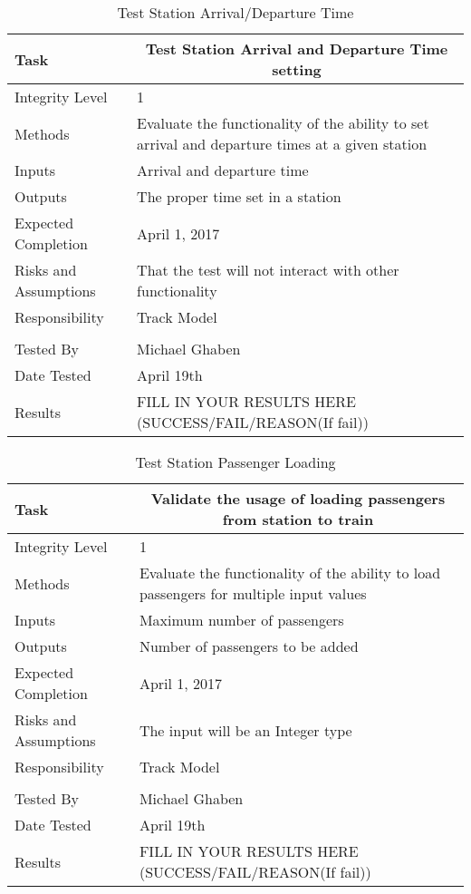\documentclass[]{article}
\begin{document}
\begin{table}[H]
	\centering
	\caption{Test Station Arrival/Departure Time}
	\begin{tabular}{|l|l|}
		\hline
		Task & \multicolumn{1}{c|}{Test Station Arrival and Departure Time setting} \\ \hline
		Integrity Level & 1 \\ \hline
		Methods & Evaluate the functionality of the ability to set arrival and departure times at a given station \\ \hline
		Inputs &  Arrival and departure time \\ \hline
		Outputs &  \parbox[t]{10cm}{The proper time set in a station}\\ \hline
		Expected Completion & April 1, 2017\\ \hline
		Risks and Assumptions & That the test will not interact with other functionality \\ \hline
		Responsibility & Track Model\\ \hline
		\\ \hline
		Tested By   &  Michael Ghaben\\	\hline
		Date Tested & \parbox[t]{10cm}{April 19th}\\ \hline
		Results & FILL IN YOUR RESULTS HERE (SUCCESS/FAIL/REASON(If fail))\\ \hline
	\end{tabular}
\end{table}

\begin{table}[H]
	\centering
	\caption{Test Station Passenger Loading}
	\begin{tabular}{|l|l|}
		\hline
		Task & \multicolumn{1}{c|}{Validate the usage of loading passengers from station to train} \\ \hline
		Integrity Level & 1 \\ \hline
		Methods & Evaluate the functionality of the ability to load passengers for multiple input values \\ \hline
		Inputs &  Maximum number of passengers\\ \hline
		Outputs &  \parbox[t]{10cm}{Number of passengers to be added}\\ \hline
		Expected Completion & April 1, 2017\\ \hline
		Risks and Assumptions & The input will be an Integer type \\ \hline
		Responsibility & Track Model\\ \hline
		\\ \hline
		Tested By   &  Michael Ghaben\\	\hline
		Date Tested & \parbox[t]{10cm}{April 19th}\\ \hline
		Results & FILL IN YOUR RESULTS HERE (SUCCESS/FAIL/REASON(If fail))\\ \hline
	\end{tabular}
\end{table}
\end{document}
